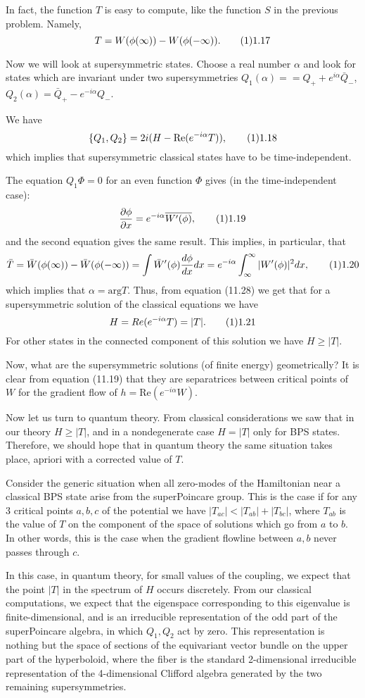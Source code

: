 In fact, the function $T$ is easy to compute, like
the function $S$ in the previous problem. Namely,
$$
T=W(\phi(\infty))-W(\phi(-\infty)).\tag 11.17
$$

Now we will look at supersymmetric states. Choose a real number
$\alpha$ and look for states which are invariant under
two supersymmetries $Q_1(\alpha)==Q_++e^{i\alpha}\bar Q_-$,
$Q_2(\alpha)=\bar Q_+-e^{-i\alpha}Q_-$.

We have
$$
\{Q_1,Q_2\}=2i(H-\text{Re}(e^{-i\alpha}T)),\tag 11.18
$$
which implies that supersymmetric classical states have to be
time-independent.

The equation $Q_1\Phi=0$ for an even function $\Phi$ gives
(in the time-independent case):
$$
\frac{\d \phi}{\d x}=e^{-i\alpha}\overline{W'(\phi)},\tag 11.19
$$
and the second equation gives the same result.
This implies, in particular, that
$$
\bar T=\bar W(\phi(\infty))-\bar W(\phi(-\infty))=
\int\bar W'(\phi)\frac{d\phi}{d x}dx=
e^{-i\alpha}\int_{\-\infty}^{\infty} |W'(\phi)|^2dx,\tag 11.20
$$
which implies that $\alpha=\text{arg}T$.
Thus, from equation (11.28) we get that for a supersymmetric solution
of the classical equations we have
$$
H=Re(e^{-i\alpha}T)=|T|.\tag 11.21
$$
For other states in the connected component of this solution
we have $H\ge |T|$.

Now, what are the supersymmetric solutions (of finite energy) geometrically?
It is clear from equation (11.19) that they are separatrices
between critical points of $W$ for the gradient flow of
$h=\text{Re}(e^{-i\alpha}W)$.

Now let us turn to quantum theory. From classical considerations
we saw that in our theory $H\ge |T|$, and in a nondegenerate
case $H=|T|$ only for BPS states. Therefore, we should hope
that in quantum theory the same situation takes place, apriori with
a corrected value of $T$.

Consider the generic situation when all
zero-modes of the Hamiltonian near a classical BPS state
arise from the superPoincare group.
This is the case if for any 3 critical points
$a,b,c$ of the potential we have
$|T_{ac}|<|T_{ab}|+|T_{bc}|$, where $T_{ab}$ is the value of $T$
on the component of the space of solutions which go from $a$ to $b$.
In other words, this is the case when the gradient flowline between $a,b$
never passes through $c$.

In this case, in quantum theory,
for small values of the coupling, we expect
that the point $|T|$ in the spectrum of $H$ occurs discretely.
 From our classical computations,
we expect that the eigenspace corresponding to this eigenvalue
is finite-dimensional, and is an irreducible representation
of the odd part of the superPoincare algebra, in which $Q_1,Q_2$ act by zero.
This representation is nothing but the space of sections
of the equivariant vector bundle on the upper part of the hyperboloid,
where the fiber is the standard 2-dimensional irreducible representation
of the 4-dimensional Clifford algebra generated by the two remaining
supersymmetries.

